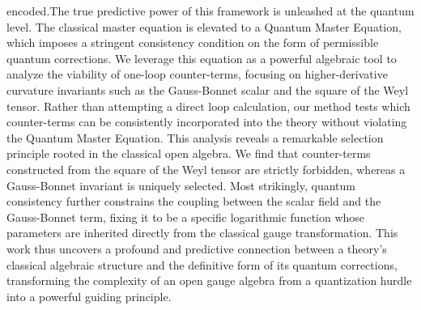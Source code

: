 \documentclass[twocolumn]{aastex631}
\begin{document}
encoded.The true predictive power of this framework is unleashed at the quantum level. The classical master equation is elevated to a Quantum Master Equation, which imposes a stringent consistency condition on the form of permissible quantum corrections. We leverage this equation as a powerful algebraic tool to analyze the viability of one-loop counter-terms, focusing on higher-derivative curvature invariants such as the Gauss-Bonnet scalar and the square of the Weyl tensor. Rather than attempting a direct loop calculation, our method tests which counter-terms can be consistently incorporated into the theory without violating the Quantum Master Equation. This analysis reveals a remarkable selection principle rooted in the classical open algebra. We find that counter-terms constructed from the square of the Weyl tensor are strictly forbidden, whereas a Gauss-Bonnet invariant is uniquely selected. Most strikingly, quantum consistency further constrains the coupling between the scalar field and the Gauss-Bonnet term, fixing it to be a specific logarithmic function whose parameters are inherited directly from the classical gauge transformation. This work thus uncovers a profound and predictive connection between a theory's classical algebraic structure and the definitive form of its quantum corrections, transforming the complexity of an open gauge algebra from a quantization hurdle into a powerful guiding principle.
\end{document}
